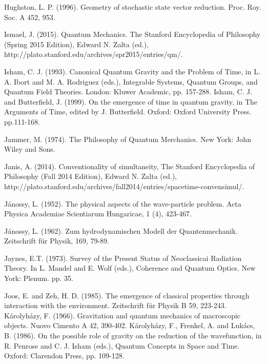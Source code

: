 \begin{thebibliography}{}
\bibitem{} Hughston, L. P. (1996). Geometry of stochastic state vector reduction. Proc. Roy. Soc. A 452, 953.

\bibitem{} Ismael, J. (2015). Quantum Mechanics. The Stanford Encyclopedia of Philosophy (Spring 2015 Edition), Edward N. Zalta (ed.), http://plato.stanford.edu/archives/spr2015/entries/qm/.

\bibitem{} Isham, C. J. (1993). Canonical Quantum Gravity and the Problem of Time, in L. A. Ibort and M. A. Rodriguez (eds.), Integrable Systems, Quantum Groups, and Quantum Field Theories. London: Kluwer Academic, pp. 157-288.
\bibitem{} Isham, C. J. and Butterfield, J. (1999). On the emergence of time in quantum gravity, in The Arguments of Time, edited by J. Butterfield. Oxford: Oxford University Press. pp.111-168.

\bibitem{} Jammer, M. (1974). The Philosophy of Quantum Merchanics. New York: John Wiley and Sons.

\bibitem{} Janis, A. (2014). Conventionality of simultaneity, The Stanford Encyclopedia of Philosophy (Fall 2014 Edition), Edward N. Zalta (ed.), http://plato.stanford.edu/archives/fall2014/entries/spacetime-convensimul/.

\bibitem{} J\'{a}nossy, L. (1952). The physical aspects of the wave-particle problem. Acta Physica Academiae Scientiarum Hungaricae, 1 (4), 423-467.

\bibitem{} J\'{a}nossy, L. (1962). Zum hydrodynamischen Modell der Quantenmechanik. Zeitschrift f\"{u}r Physik, 169, 79-89.


\bibitem{} Jaynes, E.T. (1973). Survey of the Present Status of Neoclassicai Radiation Theory. In L. Mandel and E. Wolf (eds.), Coherence and Quantum Optics. New York: Plenum. pp. 35.

\bibitem{} Joos, E. and Zeh, H. D. (1985). The emergence of classical properties through interaction with the environment. Zeitschrift für Physik B 59, 223-243. 
\bibitem{} K\'{a}rolyh\'{a}zy, F. (1966). Gravitation and quantum mechanics of macroscopic objects. Nuovo Cimento A 42, 390-402.
\bibitem{} K\'{a}rolyh\'{a}zy, F., Frenkel, A. and Luk\'{a}cs, B. (1986). On the possible role of gravity on the reduction of the wavefunction, in R. Penrose and C. J. Isham (eds.), Quantum Concepts in Space and Time. Oxford: Clarendon Press, pp. 109-128.


\end{thebibliography}
